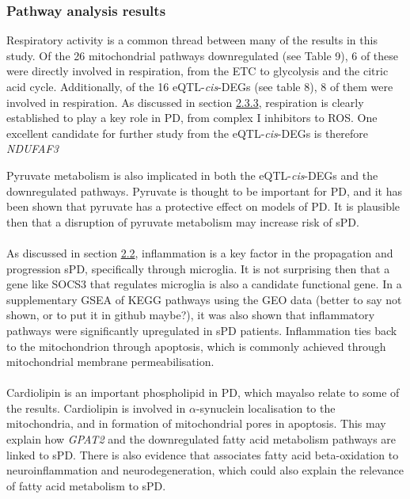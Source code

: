 \documentclass{article}
\begin{document}
\subsubsection{Pathway analysis results}
Respiratory activity is a common thread between many of the results in this study. Of the 26 mitochondrial pathways downregulated (see Table 9), 6 of these were directly involved in respiration, from the ETC to glycolysis and the citric acid cycle. Additionally, of the 16 eQTL-\textit{cis}-DEGs (see table 8), 8 of them were involved in respiration. As discussed in section \hyperref[para:oxidative]{2.3.3}, respiration is clearly established to play a key role in PD, from complex I inhibitors\cite{Langston1983ChronicSynthesis} to ROS\cite{Subramaniam2013MitochondrialDisease}. One excellent candidate for further study from the eQTL-\textit{cis}-DEGs is therefore \textit{NDUFAF3}

Pyruvate metabolism is also implicated in both the eQTL-\textit{cis}-DEGs and the downregulated pathways. Pyruvate is thought to be important for PD\cite{Gray2014RegulationDisease}, and it has been shown that pyruvate has a protective effect on models of PD\cite{Kim2022PyruvateDisease}. It is plausible then that a disruption of pyruvate metabolism may increase risk of sPD.
\\
\\As discussed in section \hyperref[subsec:inflammation]{2.2}, inflammation is a key factor in the propagation and progression sPD, specifically through microglia\cite{Isik2023MicrogliaDisease}. It is not surprising then that a gene like SOCS3 that regulates microglia\cite{Wang2024SOCS3Macrophages} is also a candidate functional gene. In a supplementary GSEA of KEGG pathways using the GEO data (better to say not shown, or to put it in github maybe?), it was also shown that inflammatory pathways were significantly upregulated in sPD patients. Inflammation ties back to the mitochondrion through apoptosis\cite{Vringer2023MitochondriaInflammation}, which is commonly achieved through mitochondrial membrane permeabilisation.
\\
\\Cardiolipin is an important phospholipid in PD, which mayalso relate to some of the results. Cardiolipin is involved in $\alpha$-synuclein localisation to the mitochondria\cite{Ghio2016InteractionCardiolipin}, and in formation of mitochondrial pores in apoptosis\cite{Vringer2023MitochondriaInflammation}. This may explain how \textit{GPAT2} and the downregulated fatty acid metabolism pathways are linked to sPD. There is also evidence that associates fatty acid beta-oxidation to neuroinflammation and neurodegeneration\cite{Bogie2020FattyDisorders}, which could also explain the relevance of fatty acid metabolism to sPD.
\end{document}

